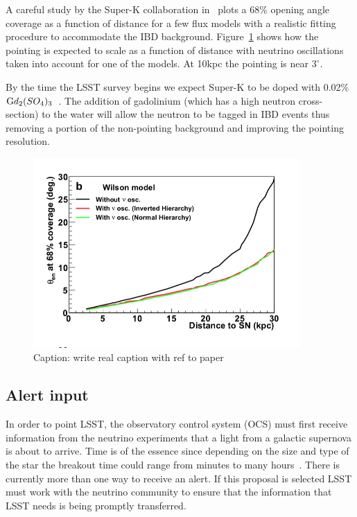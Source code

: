 \documentclass[11pt, letterpaper]{article}
\newcommand{\superk}  {Super\nobreakdash-K\xspace}
\begin{document}
A careful study by the \superk collaboration
in~\cite{2016APh....81...39A} plots a 68\% opening angle coverage as a
function of distance for a few flux models with a realistic fitting
procedure to accommodate the IBD
background. Figure~\ref{fig:SK-realtime-pointing-resolution} shows how
the pointing is expected to scale as a function of distance with
neutrino oscillations taken into account for one of the models. At
10kpc the pointing is near $3^\circ$.

By the time the LSST survey begins we expect \superk to be doped with
0.02\% $\textrm Gd_2(SO_4)_3$~\cite{2018JCAP...04..025B}.  The
addition of gadolinium (which has a high neutron cross-section) to the
water will allow the neutron to be tagged in IBD events thus removing
a portion of the non-pointing background and improving the pointing
resolution.

\begin{figure}
  \begin{center}
    \includegraphics[width=4.0in]{SK-realtime-pointing-resolution}
    \caption{Caption: write real caption with ref to paper}
    \label{fig:SK-realtime-pointing-resolution}
  \end{center}
\end{figure}

\subsection{Alert input}

In order to point LSST, the observatory control system (OCS) must
first receive information from the neutrino experiments that a light
from a galactic supernova is about to arrive.  Time is of the essence
since depending on the size and type of the star the breakout time
could range from minutes to many hours~\cite{2013ApJ...778...81K}.
There is currently more than one way to receive an alert. If this
proposal is selected LSST must work with the neutrino community to
ensure that the information that LSST needs is being promptly
transferred.
\end{document}
